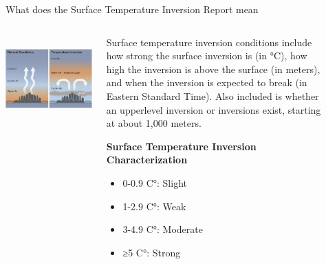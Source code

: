 \documentclass[final,xcolor=table]{beamer}
\newlength{\sepwidth}
\newlength{\colwidth}
\newcommand{\separatorcolumn}{\begin{column}{\sepwidth}\end{column}}
\begin{document}
\begin{frame}[t]
\begin{columns}[t]
\begin{column}{\colwidth}
\begin{block}{What does the Surface Temperature Inversion Report mean}
    \begin{columns}[T]
    \begin{column}{0.43\linewidth}
    ~\includegraphics[width=1\textwidth]{citypic.png}
    \end{column}
    \begin{column}{0.5\linewidth}
    
        Surface temperature inversion conditions include how strong the surface inversion is (in °C), how high the inversion is above the surface (in meters), and when the inversion is expected to break (in Eastern Standard Time). Also included is whether an upperlevel inversion or inversions exist, starting at about 1,000 meters.
        
        \textbf{Surface Temperature Inversion Characterization}
            \begin{itemize}
              \item 0-0.9 C°: Slight
              \item 1-2.9 C°: Weak
              \item 3-4.9 C°: Moderate
              \item ≥5 C°: Strong
            \end{itemize}
    \end{column}
    \end{columns}    


  \end{block}
  

\end{column}

\separatorcolumn

\begin{column}{\colwidth}


\end{column}
\end{columns}
\end{frame}
\end{document}
